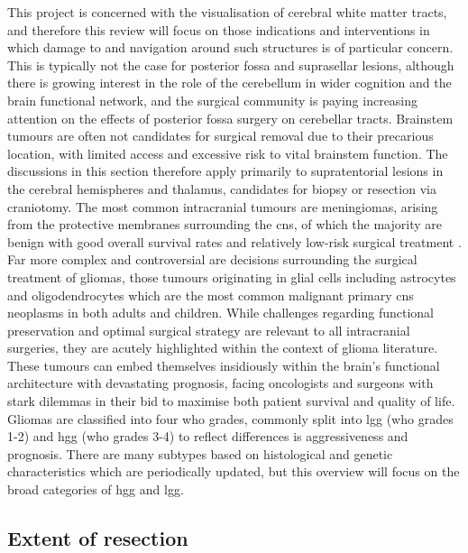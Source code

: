 This project is concerned with the visualisation of cerebral white matter tracts, and therefore this review will focus on those indications and interventions in which damage to and navigation around such structures is of particular concern.
This is typically not the case for posterior fossa and suprasellar lesions, although there is growing interest in the role of the cerebellum in wider cognition and the brain functional network, and the surgical community is paying increasing attention on the effects of posterior fossa surgery on cerebellar tracts\autocite{Toescu2021,Skye2023}.
Brainstem tumours are often not candidates for surgical removal due to their precarious  location, with limited access and excessive risk to vital brainstem function.
The discussions in this section therefore apply primarily to supratentorial lesions in the cerebral hemispheres and thalamus, candidates for biopsy or resection via craniotomy.
The most common intracranial tumours are meningiomas, arising from the protective membranes surrounding the \gls{cns}, of which the majority are benign with good overall survival rates and relatively low-risk surgical treatment \autocite{Rogers2015,Spena2022}.
Far more complex and controversial are decisions surrounding the surgical treatment of gliomas, those tumours originating in glial cells including astrocytes and oligodendrocytes which are the most common malignant primary \gls{cns} neoplasms in both adults\autocite{Ostrom2015,Wanis2021} and children\autocite{Ostrom2015,Bauchet2009}.
While challenges regarding functional preservation and optimal surgical strategy are relevant to all intracranial surgeries, they are acutely highlighted within the context of glioma literature.
These tumours can embed themselves insidiously within the brain's functional architecture with devastating prognosis, facing  oncologists and surgeons with stark dilemmas in their bid to maximise both patient survival and quality of life.
Gliomas are classified into four \gls{who}  grades, commonly split into \gls{lgg} (\gls{who} grades 1-2) and \gls{hgg} (\gls{who} grades 3-4) to reflect differences is aggressiveness and prognosis.
There are many subtypes based on histological and genetic characteristics which are periodically updated\autocite{Louis2021}, but this overview will focus on the broad categories of \gls{hgg} and \gls{lgg}.

\subsection{Extent of resection}

